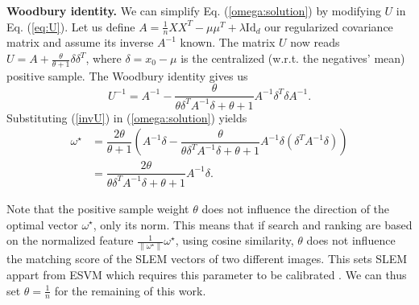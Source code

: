\textbf{Woodbury identity.} 
We can simplify Eq. (\ref{omega:solution}) by modifying $U$ in Eq. (\ref{eq:U}).
Let us define $A = \frac{1}{n}XX^T-\mu\mu^T +\lambda\mathrm{Id}_d$ our regularized covariance matrix and assume its inverse $A^{-1}$ known. 
The matrix $U$ now reads $U = A + \frac{\theta}{\theta+1}\delta\delta^T$, where $\delta=x_0-\mu$ is the centralized (w.r.t. the negatives' mean) positive sample. The Woodbury identity \cite{woodbury} gives us
\begin{equation}
U^{-1} = A^{-1} -\dfrac{\theta}{\theta\delta^TA^{-1}\delta+ \theta+1}A^{-1}\delta^T\delta A^{-1}. \label{invU}
\end{equation}
Substituting (\ref{invU}) in (\ref{omega:solution}) yields
\begin{equation}
\begin{split}
\omega^\star &= \dfrac{2\theta}{\theta +1}\left(A^{-1}\delta - \dfrac{\theta}{\theta\delta^TA^{-1}\delta+ \theta+1} A^{-1}\delta (\delta^TA^{-1}\delta)\right)\\
&= \dfrac{2\theta}{\theta\delta^TA^{-1}\delta+ \theta+1} A^{-1}\delta.\label{Wood:omega}
\end{split}
\end{equation}

Note that the positive sample weight $\theta$ does not influence the direction of the optimal vector $\omega^\star$, only its norm. This means that if search and ranking are based on the normalized feature $\frac{1}{\|\omega^\star\|}\omega^\star$, \eg using cosine similarity, $\theta$ does not influence the matching score of the SLEM vectors of two different images. This sets SLEM appart from ESVM which requires this parameter to be calibrated \cite{Efros11,ZePe15}. We can thus set $\theta=\frac{1}{n}$ for the remaining of this work.

